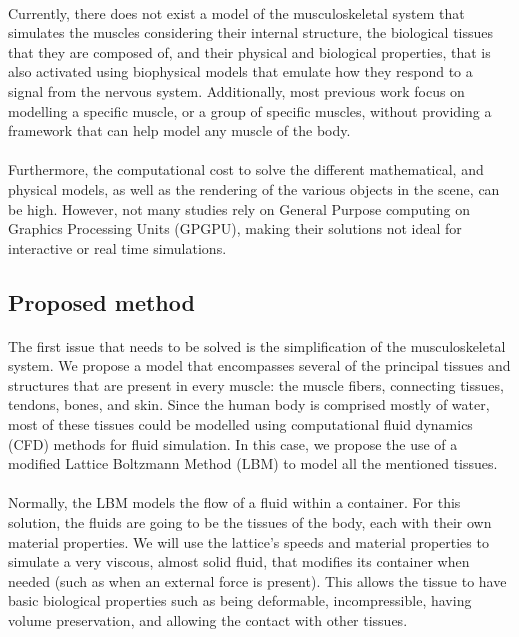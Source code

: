 \paragraph{}Currently, there does not exist a model of the musculoskeletal system that simulates the muscles considering their internal structure, the biological tissues that they are composed of, and their physical and biological properties, that is also activated using biophysical models that emulate how they respond to a signal from the nervous system. Additionally, most previous work focus on modelling a specific muscle, or a group of specific muscles, without providing a framework that can help model any muscle of the body.

\paragraph{}Furthermore, the computational cost to solve the different mathematical, and physical models, as well as the rendering of the various objects in the scene, can be high. However, not many studies rely on General Purpose computing on Graphics Processing Units (GPGPU), making their solutions not ideal for interactive or real time simulations.

\subsection{Proposed method}

\paragraph{}The first issue that needs to be solved is the simplification of the musculoskeletal system. We propose a model that encompasses several of the principal tissues and structures that are present in every muscle: the muscle fibers, connecting tissues, tendons, bones, and skin. Since the human body is comprised mostly of water, most of these tissues could be modelled using computational fluid dynamics (CFD) methods for fluid simulation. In this case, we propose the use of a modified Lattice Boltzmann Method (LBM) to model all the mentioned tissues. 

\paragraph{}Normally, the LBM models the flow of a fluid within a container. For this solution, the fluids are going to be the tissues of the body, each with their own material properties. We will use the lattice's speeds and material properties to simulate a very viscous, almost solid fluid, that modifies its container when needed (such as when an external force is present). This allows the tissue to have basic biological properties such as being deformable, incompressible, having volume preservation, and allowing the contact with other tissues.

